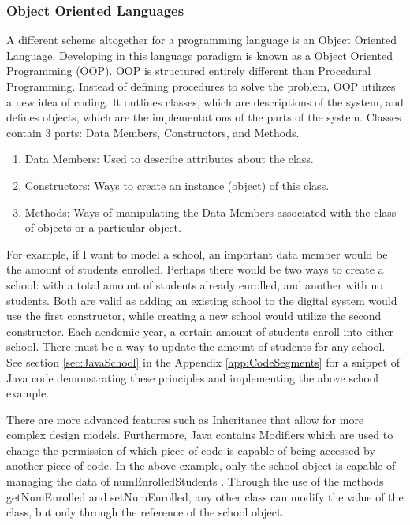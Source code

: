 \subsubsection{Object Oriented Languages}\label{subsubsec:OOPL}

A different scheme altogether for a programming language is an Object Oriented Language.
Developing in this language paradigm is known as a Object Oriented Programming (OOP).
OOP is structured entirely different than Procedural Programming.
Instead of defining procedures to solve the problem, OOP utilizes a new idea of coding.
It outlines classes, which are descriptions of the system, and defines objects, which are the implementations of the parts of the system.
Classes contain 3 parts: Data Members, Constructors, and Methods.

\begin{enumerate}
    \item Data Members: Used to describe attributes about the class.
    \item Constructors: Ways to create an instance (object) of this class.
    \item Methods: Ways of manipulating the Data Members associated with the class of objects or a particular object.
\end{enumerate}

For example, if I want to model a school, an important data member would be the amount of students enrolled.
Perhaps there would be two ways to create a school: with a total amount of students already enrolled, and another with no students.
Both are valid as adding an existing school to the digital system would use the first constructor, while creating a new school would utilize the second constructor.
Each academic year, a certain amount of students enroll into either school.
There must be a way to update the amount of students for any school.
See section \ref{sec:JavaSchool} in the Appendix \ref{app:CodeSegments} for a snippet of Java code demonstrating these principles and implementing the above school example.

There are more advanced features such as Inheritance that allow for more complex design models.
Furthermore, Java contains Modifiers which are used to change the permission of which piece of code is capable of being accessed by another piece of code.
In the above example, only the school object is capable of managing the data of numEnrolledStudents \cite{CSUNStudents}.
Through the use of the methods getNumEnrolled and setNumEnrolled, any other class can modify the value of the class, but only through the reference of the school object.

